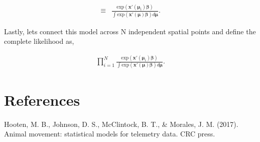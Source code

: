 \documentclass[12pt]{article}
\begin{document}
\begin{align*}
[\boldsymbol{\mu}_{i}| \boldsymbol{\beta}] \equiv &  \frac{\text{exp}(\textbf{x}'(\boldsymbol{\mu}_{i}) \boldsymbol{\beta})}{\int \text{exp}(\textbf{x}'(\boldsymbol{\mu}) \boldsymbol{\beta})d\boldsymbol{\mu}}.
\end{align*}

Lastly, lets connect this model across N independent spatial points and define the complete likelihood as,

\begin{align*}
 \prod_{i=1}^{N}  \frac{\text{exp}(\textbf{x}'(\boldsymbol{\mu}_{i}) \boldsymbol{\beta})}{\int \text{exp}(\textbf{x}'(\boldsymbol{\mu}) \boldsymbol{\beta})d\boldsymbol{\mu}}.
\end{align*}



\section{References}

Hooten, M. B., Johnson, D. S., McClintock, B. T., \& Morales, J. M. (2017). Animal movement: statistical models for telemetry data. CRC press.
\end{document}
